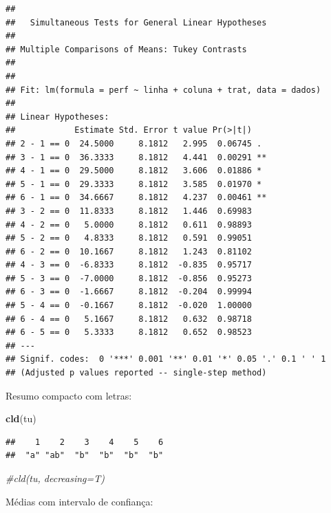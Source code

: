 \documentclass[
]{book}
\newenvironment{Shaded}{\begin{snugshade}}{\end{snugshade}}
\newcommand{\CommentTok}[1]{\textcolor[rgb]{0.56,0.35,0.01}{\textit{#1}}}
\newcommand{\DataTypeTok}[1]{\textcolor[rgb]{0.13,0.29,0.53}{#1}}
\newcommand{\KeywordTok}[1]{\textcolor[rgb]{0.13,0.29,0.53}{\textbf{#1}}}
\newcommand{\NormalTok}[1]{#1}
\newcommand{\OperatorTok}[1]{\textcolor[rgb]{0.81,0.36,0.00}{\textbf{#1}}}
\newcommand{\StringTok}[1]{\textcolor[rgb]{0.31,0.60,0.02}{#1}}
\begin{document}
\begin{verbatim}
## 
##   Simultaneous Tests for General Linear Hypotheses
## 
## Multiple Comparisons of Means: Tukey Contrasts
## 
## 
## Fit: lm(formula = perf ~ linha + coluna + trat, data = dados)
## 
## Linear Hypotheses:
##            Estimate Std. Error t value Pr(>|t|)   
## 2 - 1 == 0  24.5000     8.1812   2.995  0.06745 . 
## 3 - 1 == 0  36.3333     8.1812   4.441  0.00291 **
## 4 - 1 == 0  29.5000     8.1812   3.606  0.01886 * 
## 5 - 1 == 0  29.3333     8.1812   3.585  0.01970 * 
## 6 - 1 == 0  34.6667     8.1812   4.237  0.00461 **
## 3 - 2 == 0  11.8333     8.1812   1.446  0.69983   
## 4 - 2 == 0   5.0000     8.1812   0.611  0.98893   
## 5 - 2 == 0   4.8333     8.1812   0.591  0.99051   
## 6 - 2 == 0  10.1667     8.1812   1.243  0.81102   
## 4 - 3 == 0  -6.8333     8.1812  -0.835  0.95717   
## 5 - 3 == 0  -7.0000     8.1812  -0.856  0.95273   
## 6 - 3 == 0  -1.6667     8.1812  -0.204  0.99994   
## 5 - 4 == 0  -0.1667     8.1812  -0.020  1.00000   
## 6 - 4 == 0   5.1667     8.1812   0.632  0.98718   
## 6 - 5 == 0   5.3333     8.1812   0.652  0.98523   
## ---
## Signif. codes:  0 '***' 0.001 '**' 0.01 '*' 0.05 '.' 0.1 ' ' 1
## (Adjusted p values reported -- single-step method)
\end{verbatim}

Resumo compacto com letras:

\begin{Shaded}
\begin{Highlighting}[]
\KeywordTok{cld}\NormalTok{(tu)}
\end{Highlighting}
\end{Shaded}

\begin{verbatim}
##    1    2    3    4    5    6 
##  "a" "ab"  "b"  "b"  "b"  "b"
\end{verbatim}

\begin{Shaded}
\begin{Highlighting}[]
\CommentTok{#cld(tu, decreasing=T)}
\end{Highlighting}
\end{Shaded}

Médias com intervalo de confiança:

\begin{Shaded}
\end{Shaded}
\end{document}
